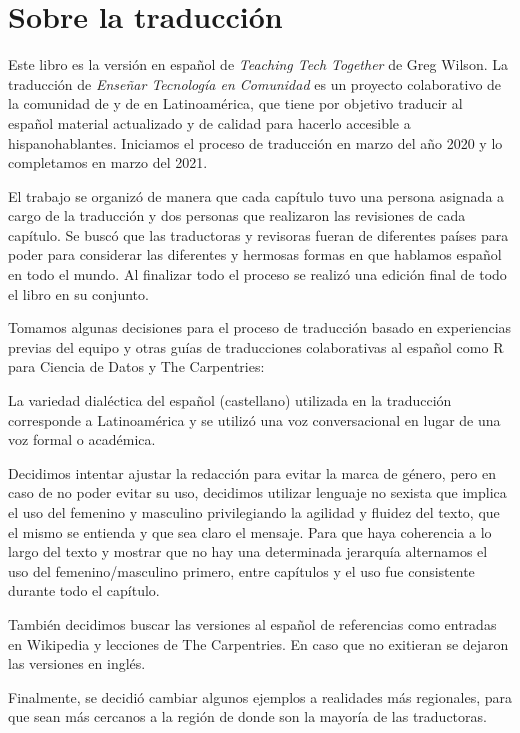 \chapter*{Sobre la traducción}

Este libro es la versión en español de \emph{Teaching Tech Together} de Greg Wilson.
La traducción de \emph{Enseñar Tecnología en Comunidad} es un proyecto colaborativo
de la comunidad de 
y de  en Latinoamérica,
que tiene por objetivo traducir al español material actualizado y de calidad para hacerlo accesible a hispanohablantes.
Iniciamos el proceso de traducción en marzo del año 2020 y lo completamos en marzo del 2021.

El trabajo se organizó de manera que cada capítulo tuvo una persona asignada a cargo de la traducción 
y dos personas que realizaron las revisiones de cada capítulo.  
Se buscó que las traductoras y revisoras fueran de diferentes países para poder para considerar las 
diferentes y hermosas formas en que hablamos español en todo el mundo.
Al finalizar todo el proceso se realizó una edición final de todo el libro en su conjunto.

Tomamos algunas decisiones para el proceso de traducción basado en experiencias previas
del equipo y otras guías de traducciones colaborativas al español como {R para Ciencia de Datos}{}
y {The Carpentries}{}:

La variedad dialéctica del español (castellano) utilizada en la traducción corresponde 
a Latinoamérica y se utilizó una voz conversacional en lugar de una voz formal o académica.

Decidimos intentar ajustar la redacción para evitar la marca de género, pero
en caso de no poder evitar su uso, decidimos utilizar lenguaje no sexista  
que implica el uso del femenino y masculino privilegiando la agilidad y fluidez del texto, 
que el mismo se entienda y que sea claro el mensaje. Para que haya coherencia 
a lo largo del texto y mostrar que no hay una determinada jerarquía 
alternamos el uso del femenino/masculino primero, entre capítulos 
y el uso fue consistente durante todo el capítulo. 

También decidimos buscar las versiones al español de referencias como 
entradas en Wikipedia y lecciones de The Carpentries.  En caso que no exitieran 
se dejaron las versiones en inglés.

Finalmente, se decidió cambiar algunos ejemplos a realidades más regionales, 
para que sean más cercanos a la región de donde son la mayoría de las
traductoras.

